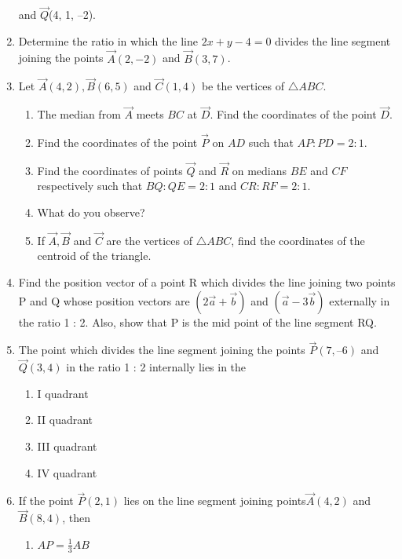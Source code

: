 \begin{enumerate}[label=\thesubsection.\arabic*,ref=\thesubsection.\theenumi]
and $\vec{Q}$(4, 1, –2).
\\
\solution
		
\item Determine the ratio in which the line $2x+y  - 4=0$ divides the line segment joining the points $\vec{A}(2, - 2)$  and  $\vec{B}(3, 7)$.
\\
\solution
	
\item Let $\vec{A}(4, 2), \vec{B}(6, 5)$  and $ \vec{C}(1, 4)$ be the vertices of $\triangle ABC$.
\begin{enumerate}
\item The median from $\vec{A}$ meets $BC$ at $\vec{D}$. Find the coordinates of the point $\vec{D}$.
\item Find the coordinates of the point $\vec{P}$ on $AD$ such that $AP : PD = 2 : 1$.
\item Find the coordinates of points $\vec{Q}$ and $\vec{R}$ on medians $BE$ and $CF$ respectively such that $BQ : QE = 2 : 1$  and  $CR : RF = 2 : 1$.
\item What do you observe?
\item If $\vec{A}, \vec{B}$ and $\vec{C}$  are the vertices of $\triangle ABC$, find the coordinates of the centroid of the triangle.
\end{enumerate}
\solution
	
\item Find the position vector of a point R which divides the line joining two points P and Q whose position vectors are $(2\vec{a}+\vec{b})$ and $(\vec{a}-3\vec{b})$
externally in the ratio 1 : 2. Also, show that P is the mid point of the line segment RQ.\\
	\solution
		
\item The point which divides the line segment joining the points $\vec{P} (7, –6) $  and  $\vec{Q}(3, 4)$ in the 
ratio 1 : 2 internally lies in the
\begin{enumerate}
\item I quadrant
\item  II quadrant
\item  III quadrant
\item  IV quadrant
\end{enumerate}
\item If the point $\vec{P} (2, 1)$ lies on the line segment joining points$\vec{A} (4, 2)$  and $ \vec{B} (8, 4)$,
then
\begin{enumerate}
	\item $AP =\frac{1}{3}{AB}$ 

\end{enumerate}
\end{enumerate}
